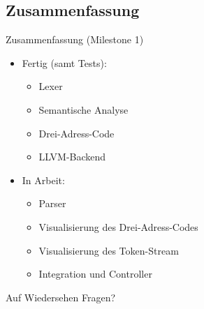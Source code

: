 \documentclass[ucs,10pt]{beamer}
\newlength{\wideitemsep}
\let\olditem\item
\renewcommand{\item}{\setlength{\itemsep}{\wideitemsep}\olditem}
\begin{document}
\subsection{Zusammenfassung}
\begin{frame}{Zusammenfassung (Milestone 1)}
	\begin{itemize}
	\item Fertig (samt Tests):
	\begin{itemize}
		\item Lexer
		\item Semantische Analyse
		\item Drei-Adress-Code
		\item LLVM-Backend
	\end{itemize}
	
	\item In Arbeit:
	\begin{itemize}
		\item Parser
		\item Visualisierung des Drei-Adress-Codes
		\item Visualisierung des Token-Stream
		\item Integration und Controller
	\end{itemize}
	\end{itemize}
\end{frame}

\begin{frame}{Auf Wiedersehen}
	Fragen?	
\end{frame}
\end{document}
